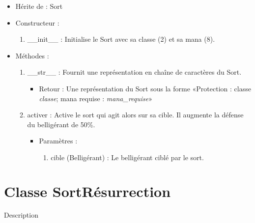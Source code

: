 \documentclass[12pt,pdftex,oneside]{article}
\begin{document}
  \begin{itemize}
  \item Hérite de : Sort


  \item Constructeur : 

  \begin{enumerate}
  \item \_\_init\_\_ : Initialise le Sort avec sa classe (2) et sa mana (8).

  \end{enumerate}

  \item Méthodes : 

    \begin{enumerate}
    \item __str__ : Fournit une représentation en chaîne de caractères du Sort.
      \begin{itemize}
      \item Retour : Une représentation du Sort sous la forme «Protection : classe \emph{classe}; mana requise : \emph{mana_requise}»
      \end{itemize}
    \item activer : Active le sort qui agit alors sur sa cible. Il augmente la
      défense du belligérant de 50\%.
      \begin{itemize}
      \item Paramètres : 
        \begin{enumerate}
        \item cible (Belligérant) : Le belligérant ciblé par le sort.
        \end{enumerate}
      \end{itemize}
    \end{enumerate}

  \end{itemize}

  \section {Classe SortRésurrection}

  Description
\end{document}

